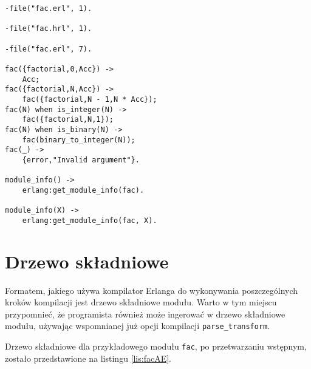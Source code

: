 \begin{lstlisting}[style=erlang, caption=Moduł \texttt{fac} po drugim przetworzeniu, label=lis:facE]
-file("fac.erl", 1).

-file("fac.hrl", 1).

-file("fac.erl", 7).

fac({factorial,0,Acc}) ->
    Acc;
fac({factorial,N,Acc}) ->
    fac({factorial,N - 1,N * Acc});
fac(N) when is_integer(N) ->
    fac({factorial,N,1});
fac(N) when is_binary(N) ->
    fac(binary_to_integer(N));
fac(_) ->
    {error,"Invalid argument"}.

module_info() ->
    erlang:get_module_info(fac).

module_info(X) ->
    erlang:get_module_info(fac, X).
\end{lstlisting}
\section{Drzewo składniowe}
\label{sec:compilationSyntaxtree}

Formatem, jakiego używa kompilator Erlanga do wykonywania poszczególnych kroków kompilacji jest drzewo składniowe modułu. Warto w tym miejscu przypomnieć, że programista również może ingerować w drzewo składniowe modułu, używając wspomnianej już opcji kompilacji \texttt{parse\_transform}.

Drzewo składniowe dla przykładowego modułu \texttt{fac}, po przetwarzaniu wstępnym, zostało przedstawione na listingu \ref{lis:facAE}.


